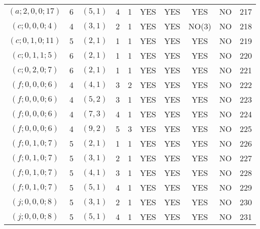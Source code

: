 \begin{longtable}{|c|c|c|c|c|c|c|c|c|c|}
$(a; 2, 0, 0; 17)$ & 6 & $(5, 1)$ & 4 & 1 & YES & YES & YES & NO & 217\\
$(c; 0, 0, 0; 4)$ & 4 & $(3, 1)$ & 2 & 1 & YES & YES & NO(3) & NO & 218\\
$(c; 0, 1, 0; 11)$ & 5 & $(2, 1)$ & 1 & 1 & YES & YES & YES & NO & 219\\
$(c; 0, 1, 1; 5)$ & 6 & $(2, 1)$ & 1 & 1 & YES & YES & YES & NO & 220\\
$(c; 0, 2, 0; 7)$ & 6 & $(2, 1)$ & 1 & 1 & YES & YES & YES & NO & 221\\
$(f; 0, 0, 0; 6)$ & 4 & $(4, 1)$ & 3 & 2 & YES & YES & YES & NO & 222\\
$(f; 0, 0, 0; 6)$ & 4 & $(5, 2)$ & 3 & 1 & YES & YES & YES & NO & 223\\
$(f; 0, 0, 0; 6)$ & 4 & $(7, 3)$ & 4 & 1 & YES & YES & YES & NO & 224\\
$(f; 0, 0, 0; 6)$ & 4 & $(9, 2)$ & 5 & 3 & YES & YES & YES & NO & 225\\
$(f; 0, 1, 0; 7)$ & 5 & $(2, 1)$ & 1 & 1 & YES & YES & YES & NO & 226\\
$(f; 0, 1, 0; 7)$ & 5 & $(3, 1)$ & 2 & 1 & YES & YES & YES & NO & 227\\
$(f; 0, 1, 0; 7)$ & 5 & $(4, 1)$ & 3 & 1 & YES & YES & YES & NO & 228\\
$(f; 0, 1, 0; 7)$ & 5 & $(5, 1)$ & 4 & 1 & YES & YES & YES & NO & 229\\
$(j; 0, 0, 0; 8)$ & 5 & $(3, 1)$ & 2 & 1 & YES & YES & YES & NO & 230\\
$(j; 0, 0, 0; 8)$ & 5 & $(5, 1)$ & 4 & 1 & YES & YES & YES & NO & 231
\end{longtable}
